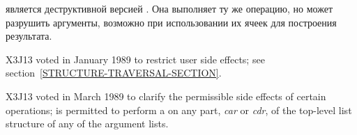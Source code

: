 \begin{defun}[Функция]
 является деструктивной версией .
Она выполняет ту же операцию, но может разрушить аргументы, возможно при
использовании их ячеек для построения результата.

\begin{new}
X3J13 voted in January 1989
to restrict user side effects; see section~\ref{STRUCTURE-TRAVERSAL-SECTION}.
\end{new}

\begin{newer}
X3J13 voted in March 1989 
to clarify the permissible side effects of certain operations;
 is permitted to perform a  on any part,
\emph{car} or \emph{cdr}, of the top-level list structure of 
any of the argument lists.
\end{newer}
\end{defun}


